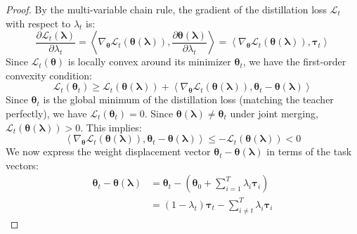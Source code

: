 \documentclass{article}
\theoremstyle{plain}
\theoremstyle{definition}
\theoremstyle{remark}
\begin{document}
\begin{proof}
By the multi-variable chain rule, the gradient of the distillation loss $\mathcal{L}_t$ with respect to $\lambda_t$ is:
\begin{equation}
    \frac{\partial \mathcal{L}_t(\boldsymbol{\lambda})}{\partial \lambda_t} = \left\langle \nabla_{\boldsymbol{\theta}} \mathcal{L}_t(\boldsymbol{\theta}(\boldsymbol{\lambda})), \frac{\partial \boldsymbol{\theta}(\boldsymbol{\lambda})}{\partial \lambda_t} \right\rangle = \left\langle \nabla_{\boldsymbol{\theta}} \mathcal{L}_t(\boldsymbol{\theta}(\boldsymbol{\lambda})), \boldsymbol{\tau}_t \right\rangle
\end{equation}
Since $\mathcal{L}_t(\boldsymbol{\theta})$ is locally convex around its minimizer $\boldsymbol{\theta}_t$, we have the first-order convexity condition:
\begin{equation}
    \mathcal{L}_t(\boldsymbol{\theta}_t) \geq \mathcal{L}_t(\boldsymbol{\theta}(\boldsymbol{\lambda})) + \left\langle \nabla_{\boldsymbol{\theta}} \mathcal{L}_t(\boldsymbol{\theta}(\boldsymbol{\lambda})), \boldsymbol{\theta}_t - \boldsymbol{\theta}(\boldsymbol{\lambda}) \right\rangle
\end{equation}
Since $\boldsymbol{\theta}_t$ is the global minimum of the distillation loss (matching the teacher perfectly), we have $\mathcal{L}_t(\boldsymbol{\theta}_t) = 0$. Since $\boldsymbol{\theta}(\boldsymbol{\lambda}) \neq \boldsymbol{\theta}_t$ under joint merging, $\mathcal{L}_t(\boldsymbol{\theta}(\boldsymbol{\lambda})) > 0$. This implies:
\begin{equation}
    \left\langle \nabla_{\boldsymbol{\theta}} \mathcal{L}_t(\boldsymbol{\theta}(\boldsymbol{\lambda})), \boldsymbol{\theta}_t - \boldsymbol{\theta}(\boldsymbol{\lambda}) \right\rangle \leq -\mathcal{L}_t(\boldsymbol{\theta}(\boldsymbol{\lambda})) < 0
\end{equation}
We now express the weight displacement vector $\boldsymbol{\theta}_t - \boldsymbol{\theta}(\boldsymbol{\lambda})$ in terms of the task vectors:
\begin{equation}
\begin{split}
    \boldsymbol{\theta}_t - \boldsymbol{\theta}(\boldsymbol{\lambda}) &= \boldsymbol{\theta}_t - \left( \boldsymbol{\theta}_0 + \sum_{i=1}^T \lambda_i \boldsymbol{\tau}_i \right) \\
    &= (1 - \lambda_t)\boldsymbol{\tau}_t - \sum_{i \neq t}^T \lambda_i \boldsymbol{\tau}_i
\end{split}
\end{equation}

\end{proof}
\end{document}
